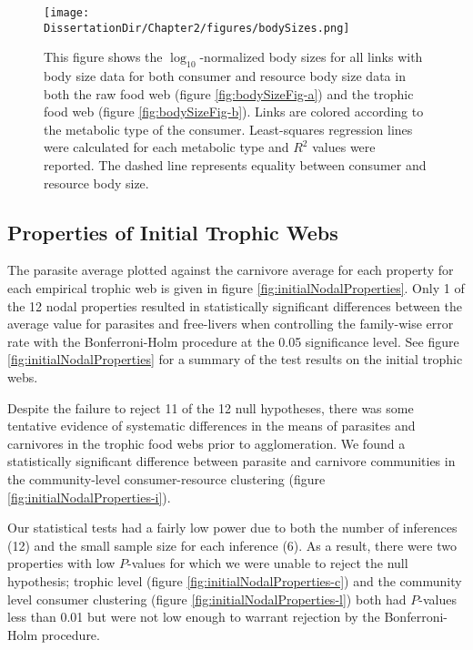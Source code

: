 \documentclass[/home/nkappler/Research/Dissertation/dissertation.tex]{subfiles}
\begin{document}
\begin{bibunit}
\begin{figure}
        \texttt{[image: \\DissertationDir/Chapter2/figures/bodySizes.png]}
        \caption[Body sizes of consumers and resources in empirical webs]%
            {This figure shows the $\log_{10}$-normalized body sizes for
            all links with body size data for both consumer and resource body
            size data in both the raw food web (figure \ref{fig:bodySizeFig-a})
            and the trophic food web (figure \ref{fig:bodySizeFig-b}). Links
            are colored according to the metabolic type of the consumer.
            Least-squares regression lines were calculated for each metabolic
            type and $R^2$ values were reported. The dashed line represents
            equality between consumer and resource body size.
        \label{fig:bodySizeFig}} 
\end{figure}

\subsection{Properties of Initial Trophic Webs} The parasite average plotted
against the carnivore average for each property for each empirical trophic web
is given in figure \ref{fig:initialNodalProperties}. Only 1 of the 12 nodal
properties resulted in statistically significant differences between the
average value for parasites and free-livers when controlling the family-wise
error rate with the Bonferroni-Holm procedure at the 0.05 significance level.
See figure \ref{fig:initialNodalProperties} for a summary of the test results
on the initial trophic webs.

Despite the failure to reject 11 of the 12 null hypotheses, there was some
tentative evidence of systematic differences in the means of parasites and
carnivores in the trophic food webs prior to agglomeration. We found a
statistically significant difference between parasite and carnivore communities
in the community-level consumer-resource clustering (figure
\ref{fig:initialNodalProperties-i}).

Our statistical tests had a fairly low power due to both the number of
inferences (12) and the small sample size for each inference (6). As a result,
there were two properties with low $P$-values for which we were unable to
reject the null hypothesis; trophic level (figure
\ref{fig:initialNodalProperties-c}) and the community level consumer clustering
(figure \ref{fig:initialNodalProperties-l}) both had $P$-values less than 0.01
but were not low enough to warrant rejection by the Bonferroni-Holm procedure.  


\end{bibunit}
\end{document}
